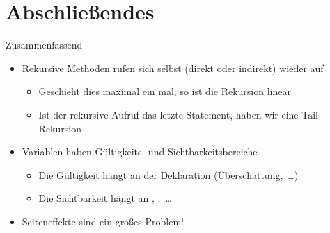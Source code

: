 \section{Abschließendes}
{\SummaryFrame
\begin{frame}[t]{Zusammenfassend}
\pause \printBibCommand
\vfill\vfill %
\begin{itemize}[<+(1)->]
    \itemsep5pt
    \item Rekursive Methoden rufen sich selbst (direkt oder indirekt) wieder auf \begin{itemize}
        \item Geschieht dies maximal ein mal, so ist die Rekursion linear
        \item Ist der rekursive Aufruf das letzte Statement, haben wir eine Tail-Rekursion
    \end{itemize}
    \item Variablen haben Gültigkeits- und Sichtbarkeitsbereiche \begin{itemize}
        \item Die Gültigkeit hängt an der Deklaration (Überschattung,~\ldots)
        \item Die Sichtbarkeit hängt an , ,~\ldots
    \end{itemize}
    \item Seiteneffekte sind ein großes Problem!
\end{itemize}
\end{frame}
}


\iffull\fi
